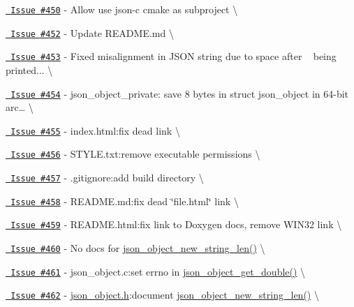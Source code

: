 \begin{DoxyItemize}
\item \href{https://github.com/json-c/json-c/issues/450}{\texttt{ Issue \#450}} -\/ Allow use json-\/c cmake as subproject \textbackslash{}
\item \href{https://github.com/json-c/json-c/issues/452}{\texttt{ Issue \#452}} -\/ Update README.\+md \textbackslash{}
\item \href{https://github.com/json-c/json-c/issues/453}{\texttt{ Issue \#453}} -\/ Fixed misalignment in JSON string due to space after ~\newline
 being printed... \textbackslash{}
\item \href{https://github.com/json-c/json-c/issues/454}{\texttt{ Issue \#454}} -\/ json\+\_\+object\+\_\+private\+: save 8 bytes in struct json\+\_\+object in 64-\/bit arc… \textbackslash{}
\item \href{https://github.com/json-c/json-c/issues/455}{\texttt{ Issue \#455}} -\/ index.\+html\+:fix dead link \textbackslash{}
\item \href{https://github.com/json-c/json-c/issues/456}{\texttt{ Issue \#456}} -\/ STYLE.\+txt\+:remove executable permissions \textbackslash{}
\item \href{https://github.com/json-c/json-c/issues/457}{\texttt{ Issue \#457}} -\/ .gitignore\+:add build directory \textbackslash{}
\item \href{https://github.com/json-c/json-c/issues/458}{\texttt{ Issue \#458}} -\/ README.\+md\+:fix dead \char`\"{}file.\+html\char`\"{} link \textbackslash{}
\item \href{https://github.com/json-c/json-c/issues/459}{\texttt{ Issue \#459}} -\/ README.\+html\+:fix link to Doxygen docs, remove WIN32 link \textbackslash{}
\item \href{https://github.com/json-c/json-c/issues/460}{\texttt{ Issue \#460}} -\/ No docs for \mbox{\hyperlink{json__object_8h_a778a1aa34a508d08daac3bdb83e24b52}{json\+\_\+object\+\_\+new\+\_\+string\+\_\+len()}} \textbackslash{}
\item \href{https://github.com/json-c/json-c/issues/461}{\texttt{ Issue \#461}} -\/ json\+\_\+object.\+c\+:set errno in \mbox{\hyperlink{json__object_8h_a94a70cff6a14398b581b7b10b0792c5b}{json\+\_\+object\+\_\+get\+\_\+double()}} \textbackslash{}
\item \href{https://github.com/json-c/json-c/issues/462}{\texttt{ Issue \#462}} -\/ \mbox{\hyperlink{json__object_8h}{json\+\_\+object.\+h}}\+:document \mbox{\hyperlink{json__object_8h_a778a1aa34a508d08daac3bdb83e24b52}{json\+\_\+object\+\_\+new\+\_\+string\+\_\+len()}} \textbackslash{}

\end{DoxyItemize}
